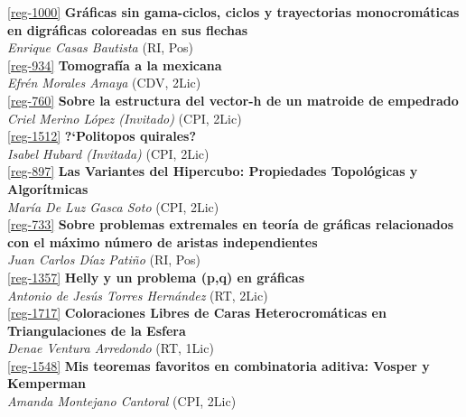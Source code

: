 \begin{multicols}{2}
\noindent  \ref{reg-1000}  {\bfseries Gr\'aficas sin gama-ciclos, ciclos y trayectorias monocrom\'aticas en digr\'aficas coloreadas en sus flechas}\\
{\slshape  Enrique  Casas Bautista} {\footnotesize (RI, Pos)}\\

\noindent  \ref{reg-934}  {\bfseries Tomograf\'ia a la mexicana}\\
{\slshape  Efr\'en  Morales Amaya} {\footnotesize (CDV, 2Lic)}\\

\noindent  \ref{reg-760}  {\bfseries Sobre la estructura del vector-h de un matroide de empedrado}\\
{\slshape  Criel  Merino L\'opez (Invitado)} {\footnotesize (CPI, 2Lic)}\\

\noindent  \ref{reg-1512}  {\bfseries ?`Politopos quirales?}\\
{\slshape  Isabel  Hubard (Invitada)} {\footnotesize (CPI, 2Lic)}\\

\noindent  \ref{reg-897}  {\bfseries Las Variantes del Hipercubo: Propiedades Topol\'ogicas y Algor\'itmicas}\\
{\slshape  Mar\'ia De Luz Gasca Soto} {\footnotesize (CPI, 2Lic)}\\

\noindent  \ref{reg-733}  {\bfseries Sobre problemas extremales en teor\'ia de gr\'aficas relacionados con el m\'aximo n\'umero de aristas independientes}\\
{\slshape  Juan Carlos D\'iaz Pati\~no} {\footnotesize (RI, Pos)}\\

\noindent  \ref{reg-1357}  {\bfseries Helly y un problema (p,q) en gr\'aficas}\\
{\slshape  Antonio de Jes\'us Torres Hern\'andez} {\footnotesize (RT, 2Lic)}\\

\noindent  \ref{reg-1717}  {\bfseries Coloraciones Libres de Caras Heterocrom\'aticas en Triangulaciones de la Esfera}\\
{\slshape  Denae  Ventura Arredondo} {\footnotesize (RT, 1Lic)}\\

\noindent  \ref{reg-1548}  {\bfseries Mis teoremas favoritos en combinatoria aditiva: Vosper y Kemperman}\\
{\slshape  Amanda  Montejano Cantoral} {\footnotesize (CPI, 2Lic)}\\


\end{multicols}
